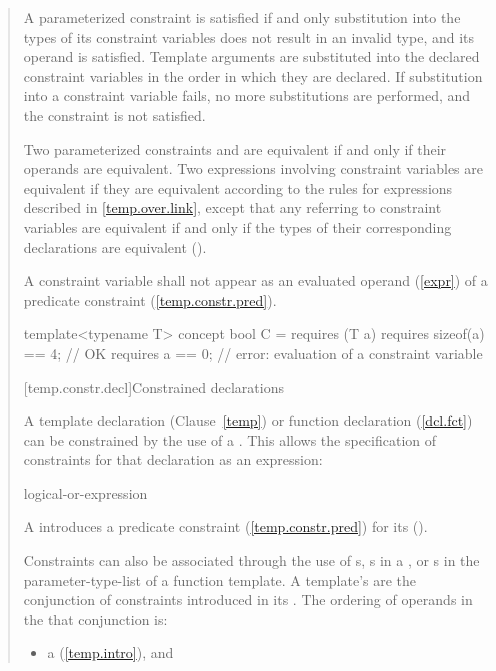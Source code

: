 \begin{quote}
\pnum
A parameterized constraint is satisfied if and only substitution into 
the types of its constraint variables does not result in an invalid type, and its
operand is satisfied. Template arguments are substituted into the declared
constraint variables in the order in which they are declared. If substitution 
into a constraint variable fails, no more substitutions are performed, and
the constraint is not satisfied.

\pnum
Two parameterized constraints  and  are equivalent 
if and only if their operands are equivalent.
% 
Two expressions involving constraint variables are equivalent if they
are equivalent according to the rules for expressions described in 
\ref{temp.over.link}, except that any  referring to 
constraint variables are equivalent if and only if the types of their 
corresponding declarations are equivalent ().

\pnum
A constraint variable shall not appear as an evaluated operand 
(\ref{expr}) of a predicate constraint (\ref{temp.constr.pred}).
\enterexample
\begin{codeblock}
template<typename T> 
  concept bool C = requires (T a) {
    requires sizeof(a) == 4; // OK
    requires a == 0;         // error: evaluation of a constraint variable
  }
\end{codeblock}
\exitexample


[temp.constr.decl]{Constrained declarations}

\pnum
A template declaration (Clause~\ref{temp}) or function declaration 
(\ref{dcl.fct}) can be constrained by the use of a 
. 
% 
This allows the specification of constraints for that declaration as
an expression:

\begin{bnf}
\br
    logical-or-expression
\end{bnf}

A  introduces a predicate constraint
(\ref{temp.constr.pred}) for its 
().

\pnum
Constraints can also be associated through the use of 
s, 
s in a 
, or 
s in the parameter-type-list
of a function template.
% 
A template's  are the conjunction of 
constraints introduced in its . 
% 
The ordering of operands in the that conjunction is:
% 
\begin{itemize}
\item a  (\ref{temp.intro}), and


\end{itemize}
\end{quote}
